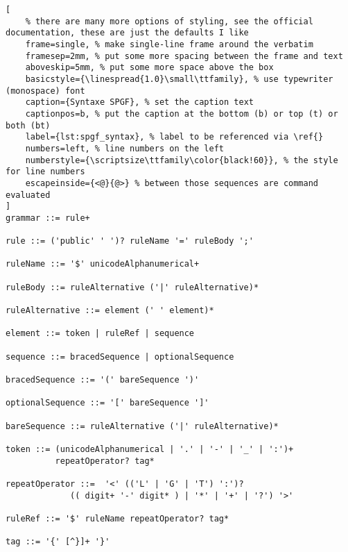 \begin{lstlisting}[
	% there are many more options of styling, see the official documentation, these are just the defaults I like
	frame=single, % make single-line frame around the verbatim
	framesep=2mm, % put some more spacing between the frame and text
	aboveskip=5mm, % put some more space above the box
	basicstyle={\linespread{1.0}\small\ttfamily}, % use typewriter (monospace) font
	caption={Syntaxe SPGF}, % set the caption text
	captionpos=b, % put the caption at the bottom (b) or top (t) or both (bt)
	label={lst:spgf_syntax}, % label to be referenced via \ref{}
	numbers=left, % line numbers on the left
	numberstyle={\scriptsize\ttfamily\color{black!60}}, % the style for line numbers
	escapeinside={<@}{@>} % between those sequences are command evaluated
]
grammar ::= rule+

rule ::= ('public' ' ')? ruleName '=' ruleBody ';'

ruleName ::= '$' unicodeAlphanumerical+

ruleBody ::= ruleAlternative ('|' ruleAlternative)*

ruleAlternative ::= element (' ' element)*

element ::= token | ruleRef | sequence

sequence ::= bracedSequence | optionalSequence

bracedSequence ::= '(' bareSequence ')'

optionalSequence ::= '[' bareSequence ']'

bareSequence ::= ruleAlternative ('|' ruleAlternative)*

token ::= (unicodeAlphanumerical | '.' | '-' | '_' | ':')+ 
          repeatOperator? tag*

repeatOperator ::=  '<' (('L' | 'G' | 'T') ':')? 
             (( digit+ '-' digit* ) | '*' | '+' | '?') '>'

ruleRef ::= '$' ruleName repeatOperator? tag*

tag ::= '{' [^}]+ '}'
\end{lstlisting}
